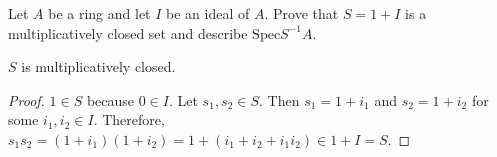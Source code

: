 \begin{problem}
Let $A$ be a ring and let $I$ be an ideal of $A$.
Prove that $S = 1 + I$ is a multiplicatively closed set and describe $\text{Spec}S^{-1}A$.
\begin{sol}
    \begin{claim}
        $S$ is multiplicatively closed.
        \begin{proof}
            $1 \in S$ because $0 \in I$.
            Let $s_1, s_2 \in S$.
            Then $s_1 = 1 + i_1$ and $s_2 = 1 + i_2$ for some $i_1, i_2 \in I$.
            Therefore, $s_1s_2 = (1 + i_1)(1 + i_2) = 1 + (i_1 + i_2 + i_1i_2) \in 1 + I = S$.
        \end{proof}
    \end{claim}

    \begin{claim}

    \end{claim}
\end{sol}
\end{problem}